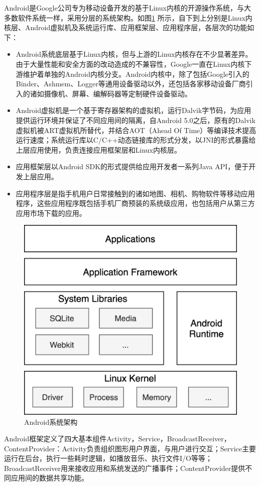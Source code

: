 \documentclass[winfonts,master,twoside]{njuthesis}
\begin{document}
Android是Google公司专为移动设备开发的基于Linux内核的开源操作系统，与大多数软件系统一样，采用分层的系统架构。如图\ref{android-os-arch}
 所示，自下到上分别是Linux内核层、Android虚拟机及系统运行库、应用框架层、应用程序层，各层次的功能如下：
\begin{itemize}
	\item Android系统底层基于Linux内核，但与上游的Linux内核存在不少显著差异。由于大量性能和安全方面的改动造成的不兼容性，Google一直在Linux内核下游维护着单独的Android内核分支。Android内核中，除了包括Google引入的Binder、Ashmem、Logger等通用设备驱动以外，还包括各家移动设备厂商引入的诸如摄像机、屏幕、编解码器等定制硬件设备驱动。
	\item Android虚拟机是一个基于寄存器架构的虚拟机，运行Dalvik字节码，为应用提供运行环境并保证了不同应用间的隔离，自Android 5.0之后，原有的Dalvik虚拟机被ART虚拟机所替代，并结合AOT（Ahead Of Time）等编译技术提高运行速度；系统运行库以C/C++动态链接库的形式分发，以JNI的形式暴露给上层应用使用，负责连接应用框架层和Linux内核层。
	\item 应用框架层以Android SDK的形式提供给应用开发者一系列Java API，便于开发上层应用。
	\item 应用程序层是指手机用户日常接触到的诸如地图、相机、购物软件等移动应用程序，这些应用程序既包括手机厂商预装的系统级应用，也包括用户从第三方应用市场下载的应用。
\end{itemize}
\begin{figure}
	\centering
	\includegraphics[width=.7\textwidth]{figure/2-background/android-os-arch.png}
	\caption{Android系统架构}
	\label{android-os-arch}
\end{figure}

Android框架定义了四大基本组件Activity，Service，BroadcastReceiver，ContentProvider：Activity负责组织图形用户界面，与用户进行交互；Service主要运行在后台，执行一些耗时逻辑，如播放音乐、执行文件I/O等等；BroadcastReceiver用来接收应用和系统发送的广播事件；ContentProvider提供不同应用间的数据共享功能。
\end{document}
